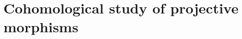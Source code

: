\section{Cohomological study of projective morphisms}
\label{section:cohomological-study-of-projective-morphisms}

